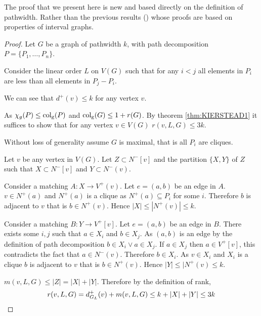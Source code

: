 The proof that we present here is new and based directly on the definition of pathwidth. Rather than the previous results (\cite{faKeKiTr1993,KIERSTEAD2000}) whose proofs are based on properties of interval graphs. 

\begin{proof}
    Let $G$ be a graph of pathwidth $k$, with path decomposition $P=\{P_1,\dots,P_n\}$. 

    Consider the linear order $L$ on $V(G)$ such that for any $i<j$ all elements in $P_i$ are less than all elements in $P_j - P_i$.  
        
    
    We can see that $d^+(v) \leq k$ for any vertex $v$. %
    
    As $\chi_g(P) \leq{\operatorname{col_g}}(P)$ and $\operatorname{col_g}(G)\leq 1+r(G)$. By theorem \ref{thm:KIERSTEAD1} it suffices to show that for any vertex $v \in V(G)$ $r(v,L,G) \leq 3k$. 
    
    Without loss of generality assume $G$ is maximal, that is all $P_i$ are cliques. 
    
    Let $v$ be any vertex in $V(G)$. Let $Z \subset N^-[v]$ and the partition $\{X,Y\}$ of $Z$ such that $X\subset N^-[v]$ and  $Y\subset N^-(v)$. 
    
    Consider a matching $A\colon X \to V^+(v)$. Let $e=(a,b)$ be an edge in $A$. $v\in N^+(a)$ and $N^+(a)$ is a clique as $N^+(a) \subseteq P_i$ for some $i$. Therefore $b$ is adjacent to $v$ that is $b\in N^+(v)$. Hence $|X|\leq|N^+(v)|\leq k$. 
    
    Consider a matching $B\colon Y \to V^+[v]$. Let $e=(a,b)$ be an edge in $B$. %
    There exists some $i,j$ such that $a\in X_i$ and $b\in X_j$. As $(a,b)$ is an edge by the definition of path decomposition $b\in X_i \lor a\in X_j$. If $a \in X_j$ then $a \in V^+[v]$, this contradicts the fact that $a\in N^-(v)$. Therefore $b\in X_i$. As $v\in X_i$ and $X_i$ is a clique $b$ is adjacent to $v$ that is $b\in N^+(v)$. Hence $|Y|\leq|N^+(v)\leq k$.  
    
    $m(v,L,G) \leq |Z| = |X|+|Y|$. Therefore by the definition of rank, \[r(v,L,G) = d^+_{G_L}(v) + m(v,L,G) \leq k + |X|+|Y| \leq 3k\qedhere\]
\end{proof}

